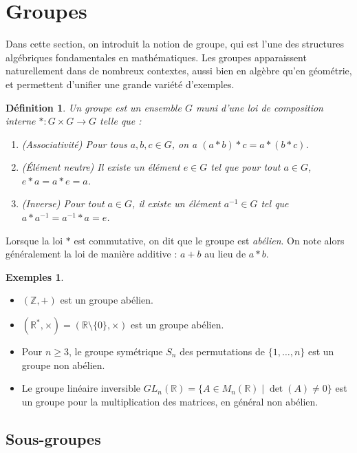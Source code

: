 \documentclass[11pt]{article}
\newtheorem{definition}{Définition}[section]
\theoremstyle{definition}
\newtheorem*{exemples}{Exemples}
\begin{document}
\section{Groupes}

Dans cette section, on introduit la notion de groupe, qui est l'une des
structures algébriques fondamentales en mathématiques. Les groupes
apparaissent naturellement dans de nombreux contextes, aussi bien en algèbre
qu'en géométrie, et permettent d'unifier une grande variété d'exemples.

\begin{definition}
Un \emph{groupe} est un ensemble $G$ muni d'une \emph{loi de composition
interne} $\ast : G\times G\to G$ telle que :
\begin{enumerate}
  \item \emph{(Associativité)} Pour tous $a,b,c\in G$, on a
    $(a\ast b)\ast c = a\ast(b\ast c)$.
  \item \emph{(Élément neutre)} Il existe un élément $e\in G$ tel que pour
    tout $a\in G$, $e\ast a = a\ast e = a$.
  \item \emph{(Inverse)} Pour tout $a\in G$, il existe un élément
    $a^{-1}\in G$ tel que $a\ast a^{-1} = a^{-1}\ast a = e$.
\end{enumerate}
\end{definition}

Lorsque la loi $\ast$ est commutative, on dit que le groupe est
\emph{abélien}. On note alors généralement la loi de manière additive :
$a+b$ au lieu de $a\ast b$.

\begin{exemples}\leavevmode
\begin{itemize}
  \item $(\mathbb{Z},+)$ est un groupe abélien.
  \item $(\mathbb{R}^\ast,\times) = (\mathbb{R}\setminus\{0\},\times)$ est un
    groupe abélien.
  \item Pour $n\ge 3$, le groupe symétrique $S_n$ des permutations de
    $\{1,\dots,n\}$ est un groupe non abélien.
  \item Le groupe linéaire inversible
    $GL_n(\mathbb{R}) = \{A\in M_n(\mathbb{R}) \mid \det(A)\neq 0\}$ est un
    groupe pour la multiplication des matrices, en général non abélien.
\end{itemize}
\end{exemples}

\subsection{Sous-groupes}
\end{document}
